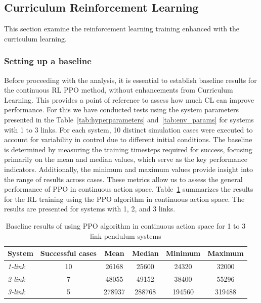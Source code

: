 \subsection{Curriculum Reinforcement Learning} \label{subsec: RL training enhancement with CL}

This section examine the reinforcement learning training enhanced with the curriculum learning. 

\subsubsection{Setting up a baseline}

Before proceeding with the analysis, it is essential to establish baseline results for the continuous RL PPO method, without enhancements from Curriculum Learning. This provides a point of reference to assess how much CL can improve performance. For this we have conducted tests using the system parameters presented in the Table~\ref{tab:hyperparameters} and~\ref{tab:env_params} for systems with 1 to 3 links. For each system, 10 distinct simulation cases were executed to account for variability in control due to different initial conditions. The baseline is determined by measuring the training timesteps required for success, focusing primarily on the mean and median values, which serve as the key performance indicators. Additionally, the minimum and maximum values provide insight into the range of results across cases. These metrics allow us to assess the general performance of PPO in continuous action space. Table~\ref{tab: baseline statistics for PPO in continuous action space} summarizes the results for the RL training using the PPO algorithm in continuous action space. The results are presented for systems with 1, 2, and 3 links.

\begin{table}[ht]
	\centering
	\caption{Baseline results of using PPO algorithm in continuous action space for 1 to 3 link pendulum systems}
	\begin{tabular}{@{}lccccc@{}}
		\toprule
		\textbf{System} & \textbf{Successful cases} & \textbf{Mean} & \textbf{Median} & \textbf{Minimum} & \textbf{Maximum} \\ \midrule
		\textit{1-link} & 10 & 26168 & 25600 & 24320 & 32000 \\
		\textit{2-link} & 7 & 48055 & 49152 & 38400 & 55296 \\
		\textit{3-link} & 5 & 278937 & 288768 & 194560 & 319488 \\ \bottomrule
	\end{tabular}
	\label{tab: baseline statistics for PPO in continuous action space}
\end{table}

